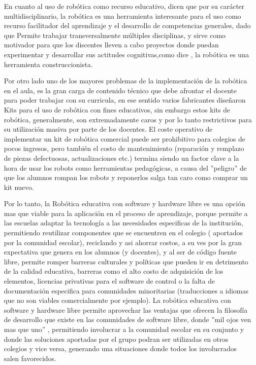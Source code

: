 En cuanto al uso de robótica como recurso educativo, \citet{sanchez_robotica_2012} dicen que por su carácter multidisciplinario, la robótica es una herramienta interesante para el uso como recurso facilitador del aprendizaje y el desarrollo de competencias generales, dado que Permite trabajar transversalmente múltiples disciplinas, y sirve como motivador para que los discentes lleven a cabo proyectos donde puedan experimentar y desarrollar sus actitudes cognitivas,como dice \citet{pitti_experiencias_2010}, la robótica es una herramienta construccionista. 
 
Por otro lado uno de los mayores problemas de la implementación de la robótica en el aula, es la gran carga de contenido técnico que debe afrontar el docente para poder trabajar con su curricula, en ese sentido varios fabricantes diseñaron Kits para el uso de robótica con fines educativos, sin embargo estos kits de robótica, generalmente,  son extremadamente caros y por lo tanto restrictivos para su utilización masiva por parte de los docentes. El coste operativo de implementar un kit de robótica comercial puede ser prohibitivo para colegios de pocos ingresos, pero también el costo de mantenimiento (reparación y remplazo de piezas defectuosas, actualizaciones etc.) termina siendo un factor clave a la hora de usar los robots como herramientas pedagógicas, a causa del ''peligro'' de que los alumnos rompan los robots y reponerlos salga tan caro como comprar un kit nuevo.

Por lo tanto, la Robótica educativa con software y hardware libre es una opción mas que viable para la aplicación en el proceso de aprendizaje, 
porque permite a las escuelas adaptar la tecnología a las necesidades especificas de la institución, permitiendo reutilizar componentes que se encuentren en el colegio ( aportados por la comunidad escolar), reciclando y asi ahorrar costos, a su ves por la gran expectativa que genera en los alumnos (y docentes), y al ser de código fuente libre, permite romper barreras culturales y políticas que pueden ir en detrimento de la calidad educativa, barreras como el alto costo de adquisición de los elementos, licencias privativas para el software de control o la falta de documentación especifica para comunidades minoritarias (traducciones a idiomas que no son viables comercialmente por ejemplo). La robótica educativa con software y hardware libre permite aprovechar las ventajas que ofrecen la filosofía de desarrollo que existe en las comunidades de software libre, donde ''mil ojos ven mas que uno'' \citet{raymond_catedral_1998}, permitiendo involucrar a la comunidad escolar en su conjunto y donde las soluciones aportadas por el grupo podran ser utilizadas en otros colegios y vice versa, generando una situaciones donde todos los involucrados salen favorecidos.



